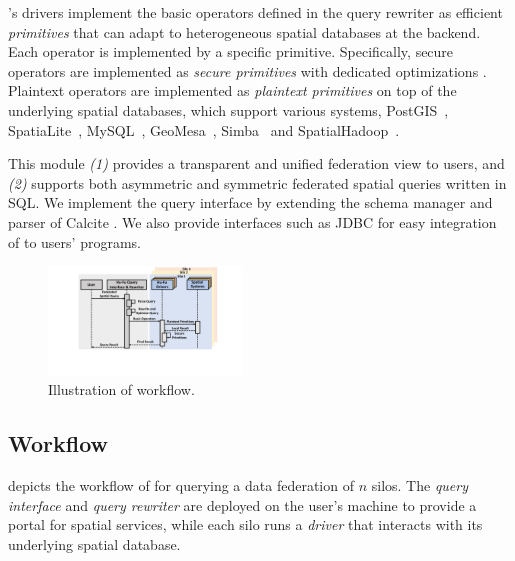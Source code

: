\sysname's drivers implement the basic operators defined in the query rewriter as efficient \textit{primitives} that can adapt to heterogeneous spatial databases at the backend.
Each operator is implemented by a specific primitive. 
Specifically, secure operators are implemented as \textit{secure primitives} with dedicated optimizations \cite{DBLP:journals/dke/EmekciSAA07, DBLP:conf/esorics/BogdanovLW08, DBLP:conf/socialcom/JurczykX11, DBLP:conf/edbt/KesarwaniKNPSMM18}. 
Plaintext operators are implemented as \textit{plaintext primitives} on top of the underlying spatial databases, which support various systems, \eg PostGIS~\cite{postgis}, SpatiaLite~\cite{spatialite}, MySQL~\cite{mysql}, GeoMesa~\cite{ds15geomesa}, Simba~\cite{sigmod16simba} and SpatialHadoop~\cite{icde15spatialhadoop}.

This module \textit{(1)} provides a transparent and unified federation view to users, and \textit{(2)} supports both asymmetric and symmetric federated spatial queries written in SQL.
We implement the query interface by extending the schema manager and parser of Calcite \cite{DBLP:conf/sigmod/BegoliCHML18}.
We also provide interfaces such as JDBC for easy integration of \sysname to users' programs.

\begin{figure}[t]
    \centering
    \includegraphics[width=0.46\textwidth]{hf-workflow.pdf}
    \caption{Illustration of \sysname workflow.}
	\label{fig:workflow}
\end{figure}

\subsection{Workflow}
\label{sec:workflow}

 depicts the workflow of \sysname for querying a data federation of $n$ silos.
The \textit{query interface} and \textit{query rewriter} are deployed on the user's machine to provide a portal for spatial services,
while each silo runs a \textit{driver} that interacts with its underlying spatial database.

